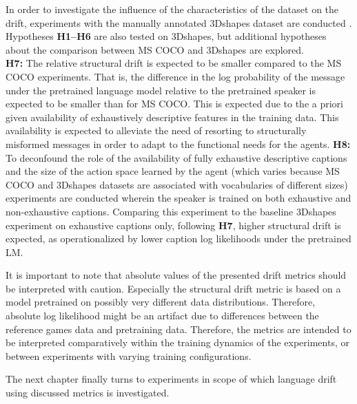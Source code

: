 \noindent In order to investigate the influence of the characteristics of the dataset on the drift, experiments with the manually annotated 3Dshapes dataset are conducted \parencite{burgess20183d}. Hypotheses \textbf{H1--H6} are also tested on 3Dshapes, but additional hypotheses about the comparison between MS COCO and 3Dshapes are explored. \\
\newline
\textbf{H7:} The relative structural drift is expected to be smaller compared to the MS COCO experiments. That is, the difference in the log probability of the message under the pretrained language model relative to the pretrained speaker is expected to be smaller than for MS COCO. This is expected due to the a priori given availability of exhaustively descriptive features in the training data. This availability is expected to alleviate the need of resorting to structurally misformed messages in order to adapt to the functional needs for the agents. \newline
\textbf{H8:} To deconfound the role of the availability of fully exhaustive descriptive captions and the size of the action space learned by the agent (which varies because MS COCO and 3Dshapes datasets are associated with vocabularies of different sizes) experiments are conducted wherein the speaker is trained on both exhaustive and non-exhaustive captions. Comparing this experiment to the baseline 3Dshapes experiment on exhaustive captions only, following \textbf{H7}, higher structural drift is expected, as operationalized by lower caption log likelihoods under the pretrained LM.\newline

\noindent It is important to note that absolute values of the presented drift metrics should be interpreted with caution. Especially the structural drift metric is based on a model pretrained on possibly very different data distributions. Therefore, absolute log likelihood might be an artifact due to differences between the reference games data and pretraining data. Therefore, the metrics are intended to be interpreted comparatively within the training dynamics of the experiments, or between experiments with varying training configurations.

The next chapter finally turns to experiments in scope of which language drift using discussed metrics is investigated. 